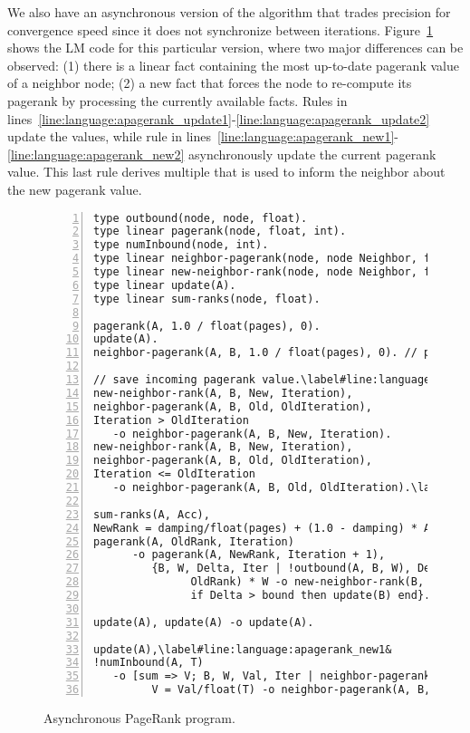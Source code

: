 We also have an asynchronous version of the algorithm that trades precision for
convergence speed since it does not synchronize between iterations.
Figure~\ref{language:code:async_pagerank} shows the LM code for this particular
version, where two major differences can be observed: (1) there is a linear fact
 containing the most up-to-date pagerank value of a
neighbor node; (2) a new  fact that forces the node to re-compute
its pagerank by processing the currently available 
facts. Rules in
lines~\ref{line:language:apagerank_update1}-\ref{line:language:apagerank_update2}
update the  values, while rule in
lines~\ref{line:language:apagerank_new1}-\ref{line:language:apagerank_new2}
asynchronously update the current pagerank value. This last rule derives
multiple  that is used to inform the neighbor about the
new pagerank value.

\begin{figure}[h!]
\begin{Verbatim}[numbers=left,fontsize=\codesize,commandchars=\\\#\&]
type outbound(node, node, float).
type linear pagerank(node, float, int).
type numInbound(node, int).
type linear neighbor-pagerank(node, node Neighbor, float Rank, int Iteration).
type linear new-neighbor-rank(node, node Neighbor, float Rank, int Iteration).
type linear update(A).
type linear sum-ranks(node, float).

pagerank(A, 1.0 / float(pages), 0).
update(A).
neighbor-pagerank(A, B, 1.0 / float(pages), 0). // pagerank of B is ...

// save incoming pagerank value.\label#line:language:apagerank_update1&
new-neighbor-rank(A, B, New, Iteration),
neighbor-pagerank(A, B, Old, OldIteration),
Iteration > OldIteration
   -o neighbor-pagerank(A, B, New, Iteration).
new-neighbor-rank(A, B, New, Iteration),
neighbor-pagerank(A, B, Old, OldIteration),
Iteration <= OldIteration
   -o neighbor-pagerank(A, B, Old, OldIteration).\label#line:language:apagerank_update2&

sum-ranks(A, Acc),
NewRank = damping/float(pages) + (1.0 - damping) * Acc,
pagerank(A, OldRank, Iteration)
      -o pagerank(A, NewRank, Iteration + 1),
         {B, W, Delta, Iter | !outbound(A, B, W), Delta = fabs(NewRank -
               OldRank) * W -o new-neighbor-rank(B, A, NewRank, Iteration + 1),
               if Delta > bound then update(B) end}.

update(A), update(A) -o update(A).

update(A),\label#line:language:apagerank_new1&
!numInbound(A, T)
   -o [sum => V; B, W, Val, Iter | neighbor-pagerank(A, B, Val, Iter),
         V = Val/float(T) -o neighbor-pagerank(A, B, Val, Iter) -> sum-ranks(A, V)].\label#line:language:apagerank_new2&
\end{Verbatim}
\caption{Asynchronous PageRank program.}
\label{language:code:async_pagerank}
\end{figure}


